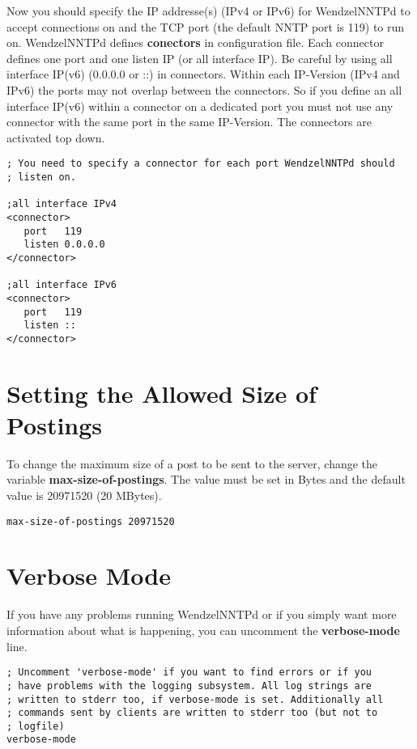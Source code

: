 Now you should specify the IP addresse(s) (IPv4 or IPv6) for WendzelNNTPd to accept connections on and the TCP port (the default NNTP port is 119) to run on.
WendzelNNTPd defines \textbf{conectors} in configuration file.
Each connector defines one port and one listen IP (or all interface IP).
Be careful by using all interface IP(v6) (0.0.0.0 or ::) in connectors.
Within each IP-Version (IPv4 and IPv6) the ports may not overlap between the connectors.
So if you define an all interface IP(v6) within a connector on a dedicated port you must not use any connector with the same port in the same IP-Version.
The connectors are activated top down.

\begin{verbatim}
; You need to specify a connector for each port WendzelNNTPd should
; listen on.

;all interface IPv4
<connector>
   port   119
   listen 0.0.0.0
</connector>

;all interface IPv6
<connector>
   port   119
   listen ::
</connector>
\end{verbatim}

\section{Setting the Allowed Size of Postings}

To change the maximum size of a post to be sent to the server, change the variable \textbf{max-size-of-postings}. The value must be set in Bytes and the default value is 20971520 (20 MBytes).

\begin{verbatim}
max-size-of-postings 20971520
\end{verbatim}

\section{Verbose Mode}

If you have any problems running WendzelNNTPd or if you simply want more information about what is happening, you can uncomment the \textbf{verbose-mode} line.

\begin{verbatim}
; Uncomment 'verbose-mode' if you want to find errors or if you
; have problems with the logging subsystem. All log strings are
; written to stderr too, if verbose-mode is set. Additionally all
; commands sent by clients are written to stderr too (but not to
; logfile)
verbose-mode
\end{verbatim}

